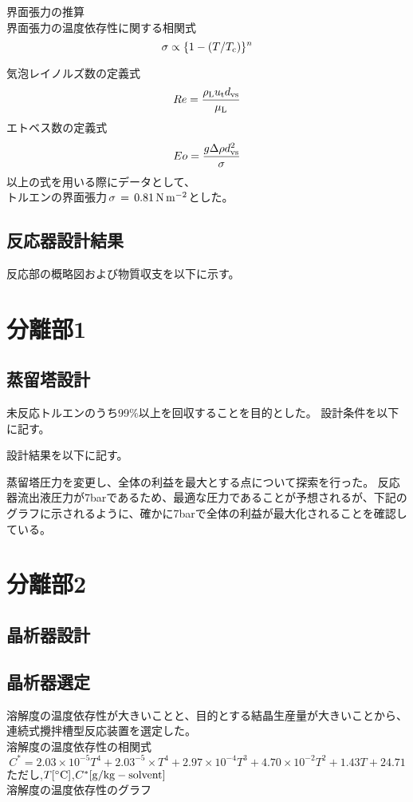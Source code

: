 \documentclass[a4j]{jsreport}
\begin{document}
界面張力の推算\\
界面張力の温度依存性に関する相関式
\begin{equation}
    \sigma \propto \{1-(T/T_{{\rm c}}) \}^n    
\end{equation}

気泡レイノルズ数の定義式
\begin{equation}
    Re = \frac{\rho_{{\rm L}}u_{{\rm t}}d_{{\rm vs}}}{\mu_{{\rm L}}}
\end{equation}
エトベス数の定義式
\begin{equation}
    Eo = \frac{g \Delta \rho d_{{\rm vs}}^2}{\sigma}
\end{equation}
以上の式を用いる際にデータとして、\\
トルエンの界面張力\,$\sigma\,=\,0.81\,{\rm N\,m^{-2}}$とした。

\section{反応器設計結果} 
反応部の概略図および物質収支を以下に示す。

\newpage
\chapter{分離部1}
\section{蒸留塔設計}
未反応トルエンのうち99\%以上を回収することを目的とした。
設計条件を以下に記す。

設計結果を以下に記す。

蒸留塔圧力を変更し、全体の利益を最大とする点について探索を行った。
反応器流出液圧力が7barであるため、最適な圧力であることが予想されるが、下記の
グラフに示されるように、確かに7barで全体の利益が最大化されることを確認している。

\newpage
\chapter{分離部2}
\section{晶析器設計}
\section{晶析器選定}
溶解度の温度依存性が大きいことと、目的とする結晶生産量が大きいことから、
連続式攪拌槽型反応装置を選定した。\\
溶解度の温度依存性の相関式
\begin{equation}
    C^*=2.03\times 10^{-5}T^4 +2.03^{-5}\times T^4 + 2.97\times 10^{-4}T^3 + 4.70\times 10^{-2}T^2
        + 1.43T + 24.71
\end{equation}
ただし,$T[{\rm ^\circ C}]$,$C^*[{\rm g/kg-solvent}]$\\
溶解度の温度依存性のグラフ
\end{document}
